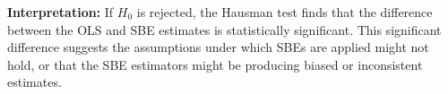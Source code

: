 \textbf{Interpretation:} If  $H_0$ is rejected, the Hausman test finds that the difference between the OLS and SBE estimates is statistically significant. This significant difference suggests the assumptions under which SBEs are applied might not hold, or that the SBE estimators might be producing biased or inconsistent estimates. 
